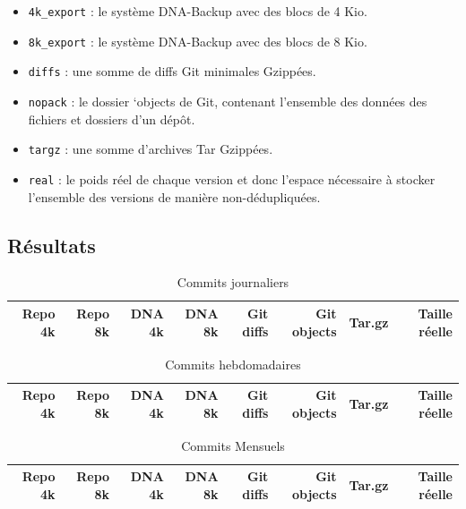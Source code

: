 \documentclass[a4paper]{report}
\begin{document}
\begin{itemize}
\item
  \verb|4k_export| : le système DNA-Backup avec des blocs de 4 Kio.
\item
  \verb|8k_export| : le système DNA-Backup avec des blocs de 8 Kio.
\item
  \verb|diffs| : une somme de diffs Git minimales Gzippées.
\item
  \verb|nopack| : le dossier `objects de Git, contenant l'ensemble des
  données des fichiers et dossiers d'un dépôt.
\item
  \verb|targz| : une somme d'archives Tar Gzippées.
\item
  \verb|real| : le poids réel de chaque version et donc l'espace
  nécessaire à stocker l'ensemble des versions de manière
  non-dédupliquées.
\end{itemize}

\subsection{Résultats}


\begin{table}[ht]
\centering
\begin{tabularx}{\textwidth}{RRRRRRRR}
\textbf{Repo 4k} &
\textbf{Repo 8k} &
\textbf{DNA 4k} &
\textbf{DNA 8k} &
\textbf{Git diffs} &
\textbf{Git objects} &
\textbf{Tar.gz} &
\textbf{Taille réelle} \\
\hline

\end{tabularx}
\caption{Commits journaliers}
\label{tab:commits-daily}
\end{table}


\begin{table}[ht]
\begin{tabularx}{\textwidth}{RRRRRRRR}
\textbf{Repo 4k} &
\textbf{Repo 8k} &
\textbf{DNA 4k} &
\textbf{DNA 8k} &
\textbf{Git diffs} &
\textbf{Git objects} &
\textbf{Tar.gz} &
\textbf{Taille réelle} \\
\hline

\end{tabularx}
\caption{Commits hebdomadaires}
\label{tab:commits-weekly}
\end{table}


\begin{table}[ht]
\begin{tabularx}{\textwidth}{RRRRRRRR}
\textbf{Repo 4k} &
\textbf{Repo 8k} &
\textbf{DNA 4k} &
\textbf{DNA 8k} &
\textbf{Git diffs} &
\textbf{Git objects} &
\textbf{Tar.gz} &
\textbf{Taille réelle} \\
\hline

\end{tabularx}
\caption{Commits Mensuels}
\label{tab:commits-monthly}
\end{table}
\end{document}
